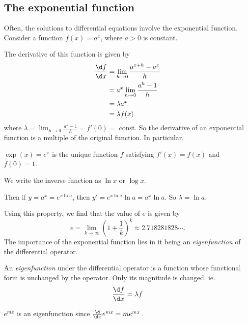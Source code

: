 \documentclass[a4paper]{article}
\begin{document}
\subsection{The exponential function}
Often, the solutions to differential equations involve the exponential function. Consider a function $f(x) = a^x$, where $a>0$ is constant.
\begin{center}
\end{center}
The derivative of this function is given by
\begin{align*}
  \frac{\d f}{\d x} &= \lim_{h\to 0}\frac{a^{x+h}-a^x}{h}\\
  &= a^x\lim_{h\to 0}\frac{a^h-1}{h}\\
  &= \lambda a^x\\
  &= \lambda f(x)
\end{align*}
where $\displaystyle \lambda = \lim_{h\to 0}\frac{a^h-1}{h} = f'(0) = $ const. So the derivative of an exponential function is a multiple of the original function. In particular,

\begin{defi}
  $\exp(x) = e^x$ is the unique function $f$ satisfying $f'(x) = f(x)$ and $f(0) = 1$.

  We write the inverse function as $\ln x$ or $\log x$.
\end{defi}
Then if $y = a^x = e^{x\ln a}$, then $y' = e^{x\ln a}\ln a = a^x\ln a$. So $\lambda = \ln a$.

Using this property, we find that the value of $e$ is given by
\[
  e=\lim_{k\to \infty} \left(1 + \frac{1}{k}\right)^k \approx 2.718281828\cdots.
\]
The importance of the exponential function lies in it being an \emph{eigenfunction} of the differential operator.
\begin{defi}[Eigenfunction]
  An \emph{eigenfunction} under the differential operator is a function whose functional form is unchanged by the operator. Only its magnitude is changed. ie.
  \[
    \frac{\d f}{\d x} = \lambda f
  \]
\end{defi}
\begin{eg}
  $e^{mx}$ is an eigenfunction since $\frac{\d }{\d x}e^{mx} = me^{mx}$.
\end{eg}
\end{document}
